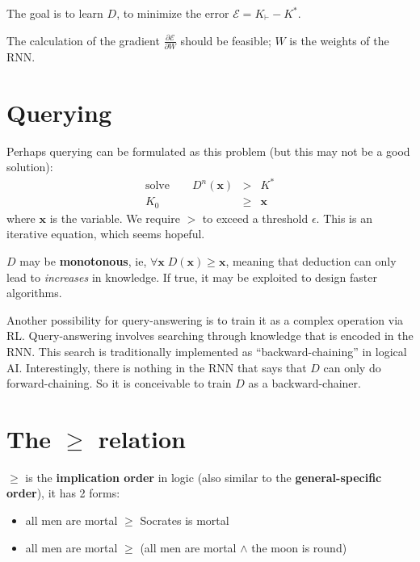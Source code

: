 \documentclass[12pt]{article}
\begin{document}
The goal is to learn $D$, to minimize the error $\mathcal{E} = K_\vdash - K^*$.

The calculation of the gradient $\frac{\partial \mathcal{E}}{\partial W}$ should be feasible;  $W$ is the weights of the RNN.


\section{Querying}

Perhaps querying can be formulated as this problem (but this may not be a good solution):
\begin{eqnarray}
\mbox{solve}\quad\quad D^n(\mathbf{x}) & > & K^* \nonumber \\
K_0 & \ge & \mathbf{x}
\end{eqnarray}
where $\mathbf{x}$ is the variable.  We require $>$ to exceed a threshold $\epsilon$.  This is an iterative equation, which seems hopeful.

$D$ may be \textbf{monotonous}, ie, $\forall \mathbf{x} \; D(\mathbf{x}) \ge \mathbf{x}$, meaning that deduction can only lead to \textit{increases} in knowledge.  If true, it may be exploited to design faster algorithms.

Another possibility for query-answering is to train it as a complex operation via RL.  Query-answering involves searching through knowledge that is encoded in the RNN.  This search is traditionally implemented as ``backward-chaining'' in logical AI.  Interestingly, there is nothing in the RNN that says that $D$ can only do forward-chaining.  So it is conceivable to train $D$ as a backward-chainer.

\section{The \texorpdfstring{$\ge$}{>} relation}

$\ge$ is the \textbf{implication order} in logic (also similar to the \textbf{general-specific order}), it has 2 forms:
\begin{itemize}
\item all men are mortal $\ge$ Socrates is mortal
\item all men are mortal $\ge$ (all men are mortal $\wedge$ the moon is round)
\end{itemize}
\end{document}
